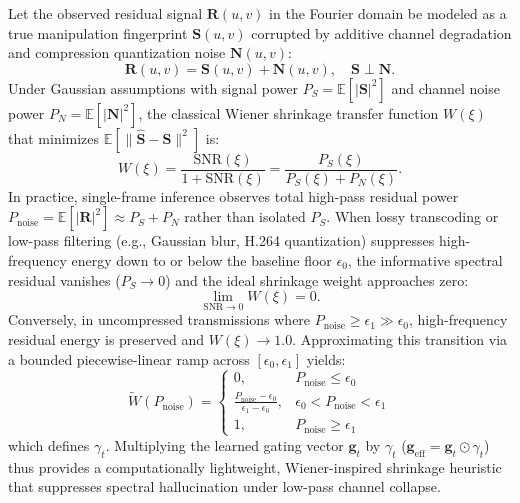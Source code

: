 \documentclass[10pt,twocolumn,letterpaper]{article}
\begin{document}
Let the observed residual signal $\mathbf{R}(u, v)$ in the Fourier domain be modeled as a true manipulation fingerprint $\mathbf{S}(u, v)$ corrupted by additive channel degradation and compression quantization noise $\mathbf{N}(u, v)$:
\begin{equation}
\mathbf{R}(u, v) = \mathbf{S}(u, v) + \mathbf{N}(u, v), \quad \mathbf{S} \perp \mathbf{N}.
\end{equation}
Under Gaussian assumptions with signal power $P_S = \mathbb{E}[|\mathbf{S}|^2]$ and channel noise power $P_N = \mathbb{E}[|\mathbf{N}|^2]$, the classical Wiener shrinkage transfer function $W(\xi)$ that minimizes $\mathbb{E}[\|\hat{\mathbf{S}} - \mathbf{S}\|^2]$ is:
\begin{equation}
W(\xi) = \frac{\mathrm{SNR}(\xi)}{1 + \mathrm{SNR}(\xi)} = \frac{P_S(\xi)}{P_S(\xi) + P_N(\xi)}.
\end{equation}
In practice, single-frame inference observes total high-pass residual power $P_{\mathrm{noise}} = \mathbb{E}[|\mathbf{R}|^2] \approx P_S + P_N$ rather than isolated $P_S$. When lossy transcoding or low-pass filtering (e.g., Gaussian blur, H.264 quantization) suppresses high-frequency energy down to or below the baseline floor $\epsilon_0$, the informative spectral residual vanishes ($P_S \to 0$) and the ideal shrinkage weight approaches zero:
\begin{equation}
\lim_{\mathrm{SNR} \to 0} W(\xi) = 0.
\end{equation}
Conversely, in uncompressed transmissions where $P_{\mathrm{noise}} \ge \epsilon_1 \gg \epsilon_0$, high-frequency residual energy is preserved and $W(\xi) \to 1.0$. Approximating this transition via a bounded piecewise-linear ramp across $[\epsilon_0, \epsilon_1]$ yields:
\begin{equation}
\tilde{W}(P_{\mathrm{noise}}) = 
\begin{cases}
0, & P_{\mathrm{noise}} \le \epsilon_0 \\
\frac{P_{\mathrm{noise}} - \epsilon_0}{\epsilon_1 - \epsilon_0}, & \epsilon_0 < P_{\mathrm{noise}} < \epsilon_1 \\
1, & P_{\mathrm{noise}} \ge \epsilon_1
\end{cases}
\end{equation}
which defines $\gamma_t$. Multiplying the learned gating vector $\mathbf{g}_t$ by $\gamma_t$ ($\mathbf{g}_{\mathrm{eff}} = \mathbf{g}_t \odot \gamma_t$) thus provides a computationally lightweight, Wiener-inspired shrinkage heuristic that suppresses spectral hallucination under low-pass channel collapse.
\end{document}
